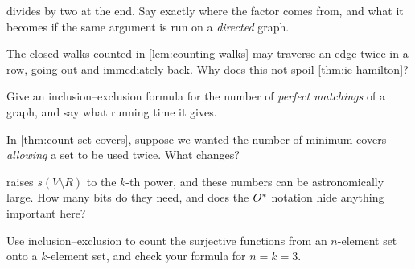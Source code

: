 \begin{exercise}
 divides by two at the end. Say exactly where the factor
comes from, and what it becomes if the same argument is run on a \emph{directed}
graph.
\end{exercise}

\begin{exercise}
The closed walks counted in \cref{lem:counting-walks} may traverse an edge twice
in a row, going out and immediately back. Why does this not spoil
\cref{thm:ie-hamilton}?
\end{exercise}

\begin{exercise}
Give an inclusion--exclusion formula for the number of \emph{perfect matchings}
of a graph, and say what running time it gives.
\end{exercise}

\begin{exercise}
In \cref{thm:count-set-covers}, suppose we wanted the number of minimum covers
\emph{allowing} a set to be used twice. What changes?
\end{exercise}

\begin{exercise}
 raises $s(V \setminus R)$ to the $k$-th power, and these
numbers can be astronomically large. How many bits do they need, and does the
$O^{*}$ notation hide anything important here?
\end{exercise}

\begin{exercise}
Use inclusion--exclusion to count the surjective functions from an $n$-element
set onto a $k$-element set, and check your formula for $n = k = 3$.
\end{exercise}

